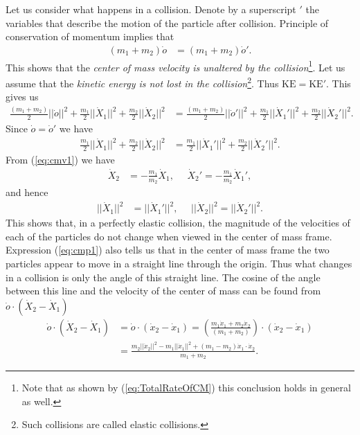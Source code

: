 \documentclass[graybox,envcountchap,sectrefs]{svmonoMuga}
\begin{document}
Let us consider what happens in a collision. Denote by a superscript $'$ the variables that describe the motion of the particle after collision. Principle of conservation of momentum implies that
\begin{align*}
(m_1+m_2)\dot{o}&=(m_1+m_2)\dot{o}'.
\end{align*}
This shows that the \textit{center of mass velocity is unaltered by the collision}\footnote{Note that as shown by (\ref{eq:TotalRateOfCM}) this conclusion holds in general as well.}.
Let us assume that the \textit{kinetic energy is not lost in the collision}\footnote{Such collisions are called elastic collisions.}. Thus $\mathrm{KE}=\mathrm{KE}'$. This gives us
\begin{align*}
\frac{(m_1+m_2)}{2}||\dot{o}||^2+\frac{m_1}{2}||\dot{X}_1||^2+\frac{m_2}{2}||\dot{X}_2||^2 &=
\frac{(m_1+m_2)}{2}||\dot{o}'||^2+\frac{m_1}{2}||\dot{X}_1'||^2+\frac{m_2}{2}||\dot{X}_2'||^2 .
\end{align*}
Since $\dot{o}=\dot{o}'$ we have
\begin{align*}
\frac{m_1}{2}||\dot{X}_1||^2+\frac{m_2}{2}||\dot{X}_2||^2 &=
\frac{m_1}{2}||\dot{X}_1'||^2+\frac{m_2}{2}||\dot{X}_2'||^2 .
\end{align*}
From (\ref{eq:cmv1}) we have
\begin{align*}
\dot{X}_2&=-\frac{m_1}{m_2}\dot{X}_1,\:\:\:\:\:\:\dot{X}_2'=-\frac{m_1}{m_2}\dot{X}_1',
\end{align*}
and hence
\begin{align*}
||\dot{X}_1||^2 &=||\dot{X}_1'||^2,\:\:\:\:\:\: ||\dot{X}_2||^2 =||\dot{X}_2'||^2.
\end{align*}
This shows that, in a perfectly elastic collision, the magnitude of the velocities of each of the particles do not change when viewed in the center of mass frame. Expression (\ref{eq:cmp1}) also tells us that in the center of mass frame the two particles appear to move in a straight line through the origin. Thus what changes in a collision is only the angle of this straight line. The cosine of the angle between this line and the velocity of the center of mass can be found from $\dot{o}\cdot(\dot{X}_2-\dot{X}_1)$
\begin{align*}
\dot{o}\cdot(\dot{X}_2-\dot{X}_1)&=\dot{o}\cdot(\dot{x}_2-\dot{x}_1)=\left(\frac{m_1\dot{x}_1+m_2\dot{x}_2}{(m_1+m_2)}\right)\cdot(\dot{x}_2-\dot{x}_1)\\
&=\frac{m_2||\dot{x}_2||^2-m_1||\dot{x}_1||^2+(m_1-m_2)\dot{x}_1\cdot\dot{x}_2}{m_1+m_2}.
\end{align*}
\end{document}
